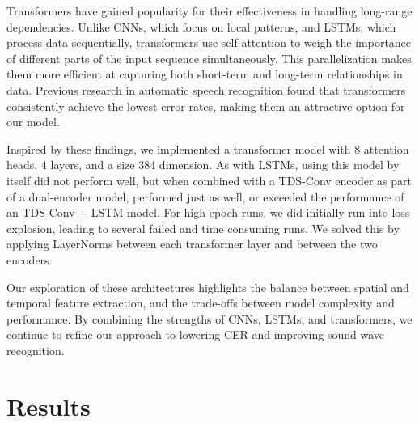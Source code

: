 \documentclass{article}
\begin{document}
Transformers have gained popularity for their effectiveness in handling long-range dependencies. Unlike CNNs, which focus on local patterns, and LSTMs, which process data sequentially, transformers use self-attention to weigh the importance of different parts of the input sequence simultaneously. This parallelization makes them more efficient at capturing both short-term and long-term relationships in data. Previous research in automatic speech recognition \cite{synnaeve} found that transformers consistently achieve the lowest error rates, making them an attractive option for our model.

Inspired by these findings, we implemented a transformer model with 8 attention heads, 4 layers, and a size 384 dimension. As with LSTMs, using this model by itself did not perform well, but when combined with a TDS-Conv encoder as part of a dual-encoder model, performed just as well, or exceeded the performance of an TDS-Conv + LSTM model. For high epoch runs, we did initially run into loss explosion, leading to several failed and time consuming runs. We solved this by applying LayerNorms between each transformer layer and between the two encoders.

Our exploration of these architectures highlights the balance between spatial and temporal feature extraction, and the trade-offs between model complexity and performance. By combining the strengths of CNNs, LSTMs, and transformers, we continue to refine our approach to lowering CER and improving sound wave recognition.


\section{Results}
\end{document}
